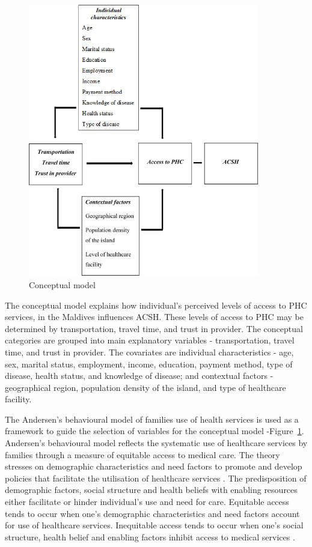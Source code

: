 \begin{figure}[H]
\caption{Conceptual model}
\label{f4}
\centering
\includegraphics[width=0.90\textwidth]{3TModel.png}
\end{figure}

The conceptual model explains how individual's perceived levels of access to PHC services, in the Maldives influences ACSH. These levels of access to PHC may be determined by transportation, travel time, and trust in provider. The conceptual categories are grouped into main explanatory variables - transportation, travel time, and trust in provider. The covariates are individual characteristics - age, sex, marital status, employment, income, education, payment method, type of disease, health status, and knowledge of disease; and contextual factors - geographical region, population density of the island, and type of healthcare facility. 

The Andersen's behavioural model of families use of health services is used as a framework to guide the selection of variables for the conceptual model -Figure~\ref{f4}. Andersen's behavioural model reflects the systematic use of healthcare services by families through a measure of equitable access to medical care. The theory stresses on demographic characteristics and need factors to promote and develop policies that facilitate the utilisation of healthcare services \cite{andersen1968behavioral}. The predisposition of demographic factors, social structure and health beliefs with enabling resources either facilitate or hinder individual's use and need for care. Equitable access tends to occur when one's demographic characteristics and need factors account for use of healthcare services. Inequitable access tends to occur when one's social structure, health belief and enabling factors inhibit access to medical services \cite{andersen1995revisiting}. 

